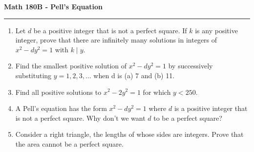 \documentclass[11pt,letterpaper]{report}
\begin{document}
\begin{center}
{\bf \Large Math 180B - Pell's Equation}
\vspace{0.2cm}
\hrule
\end{center}

\begin{enumerate}
	\item Let $d$ be a positive integer that is not a perfect square. If $k$ is any positive integer, prove that there are infinitely many solutions in integers of $x^2-dy^2 = 1$ with $k\mid y$.

	\item Find the smallest positive solution of $x^2-dy^2 = 1$ by successively substituting $y = 1, 2, 3, \ldots$ when d is (a) 7 and (b) 11.

	\item Find all positive solutions to $x^2 - 2y^2 = 1$ for which $y<250$.

	\item A Pell's equation has the form $x^2 - dy^2 = 1$ where $d$ is a positive integer that is not a perfect square. Why don't we want $d$ to be a perfect square?

	\item Consider a right triangle, the lengths of whose sides are integers. Prove that the area cannot be a perfect square.
\end{enumerate}
\end{document}
